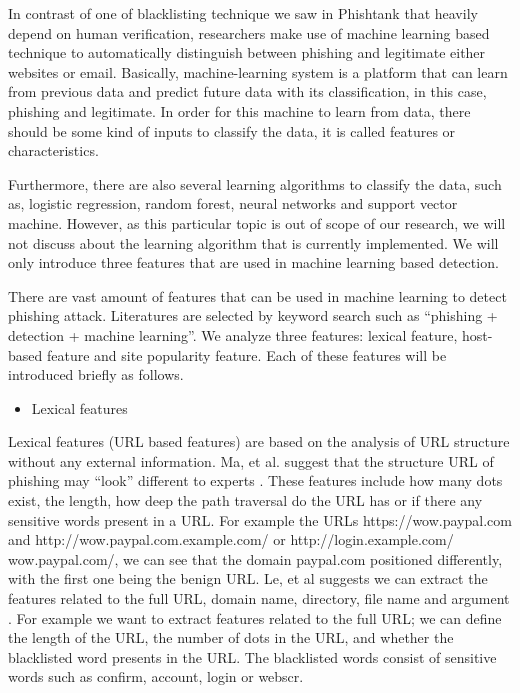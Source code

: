 In contrast of one of blacklisting technique we saw in Phishtank that
heavily depend on human verification, researchers make use of machine
learning based technique to automatically distinguish between phishing
and legitimate either websites or email. Basically, machine-learning
system is a platform that can learn from previous data and predict
future data with its classification, in this case, phishing and legitimate.
In order for this machine to learn from data, there should be some
kind of inputs to classify the data, it is called features or characteristics. 

Furthermore, there are also several learning algorithms to classify
the data, such as, logistic regression, random forest, neural networks
and support vector machine. However, as this particular topic is out
of scope of our research, we will not discuss about the learning algorithm
that is currently implemented. We will only introduce three features
that are used in machine learning based detection. 

There are vast amount of features that can be used in machine learning
to detect phishing attack. Literatures are selected by keyword search
such as ``phishing + detection + machine learning''. We analyze
three features: lexical feature, host-based feature and site popularity
feature. Each of these features will be introduced briefly as follows.
\begin{itemize}
\item Lexical features
\end{itemize}
Lexical features (URL based features) are based on the analysis of
URL structure without any external information. Ma, et al. suggest
that the structure URL of phishing may \textquotedblleft look\textquotedblright{}
different to experts \citep{ma:2009}. These features include how
many dots exist, the length, how deep the path traversal do the URL
has or if there any sensitive words present in a URL. For example
the URLs https://wow.paypal.com and http://wow.paypal.com.example.com/
or http://login.example.com/ wow.paypal.com/, we can see that the
domain paypal.com positioned differently, with the first one being
the benign URL. Le, et al suggests we can extract the features related
to the full URL, domain name, directory, file name and argument \citep{le:2011}.
For example we want to extract features related to the full URL; we
can define the length of the URL, the number of dots in the URL, and
whether the blacklisted word presents in the URL. The blacklisted
words consist of sensitive words such as confirm, account, login or
webscr. 

